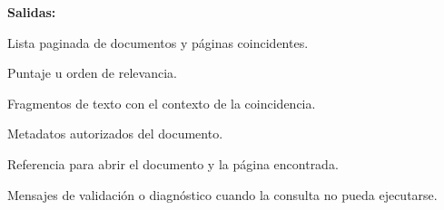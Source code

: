 \begin{definicionmodulo}
\textbf{Salidas:}
\begin{elementosmodulo}
    \item Lista paginada de documentos y páginas coincidentes.
    \item Puntaje u orden de relevancia.
    \item Fragmentos de texto con el contexto de la coincidencia.
    \item Metadatos autorizados del documento.
    \item Referencia para abrir el documento y la página encontrada.
    \item Mensajes de validación o diagnóstico cuando la consulta no pueda ejecutarse.
\end{elementosmodulo}

\end{definicionmodulo}
